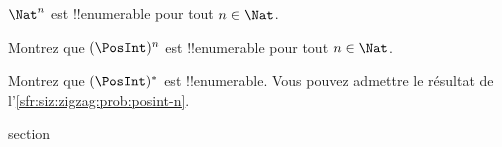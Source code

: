\documentclass[11pt,a4paper,openany]{memoir}
\begin{document}
\begin{prop}
$\Nat^n$ est !!{enumerable} pour tout $n \in \Nat$.
\end{prop}

\begin{prob}\label{sfr:siz:zigzag:prob:posint-n}
Montrez que $(\PosInt)^n$ est !!{enumerable} pour tout $n \in \Nat$.
\end{prob}

\begin{prob}\label{sfr:siz:zigzag:prob:posint-star}
Montrez que $(\PosInt)^*$ est !!{enumerable}.
Vous pouvez admettre le résultat de l’\cref{sfr:siz:zigzag:prob:posint-n}.
\end{prob}


\endgroup



\begingroup
\expandafter\def\csname ol@sectioncs\endcsname{section}
\def\olfilename{pairing}


\end{document}
